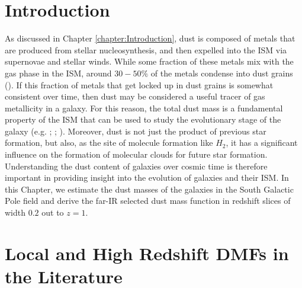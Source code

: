 \section{Introduction}

As discussed in Chapter \ref{chapter:Introduction}, dust is composed of metals that are produced from stellar nucleosynthesis, and then expelled into the ISM via supernovae and stellar winds. While some fraction of these metals mix with the gas phase in the ISM, around $30 - 50\%$ of the metals condense into dust grains (\citealt{Draine_2007b}). If this fraction of metals that get locked up in dust grains is somewhat consistent over time, then dust may be considered a useful tracer of gas metallicity in a galaxy. For this reason, the total dust mass is a fundamental property of the ISM that can be used to study the evolutionary stage of the galaxy (e.g. \citealt{Cortese_2012}; \citealt{deVis_2017a}; \citealt{deVis_2017b}). Moreover, dust is not just the product of previous star formation, but also, as the site of molecule formation like $H_2$, it has a significant influence on the formation of molecular clouds for future star formation. Understanding the dust content of galaxies over cosmic time is therefore important in providing insight into the evolution of galaxies and their ISM. In this Chapter, we estimate the dust masses of the galaxies in the South Galactic Pole field and derive the far-IR selected dust mass function in redshift slices of width $0.2$ out to $z = 1$.

\section{Local and High Redshift DMFs in the Literature}

